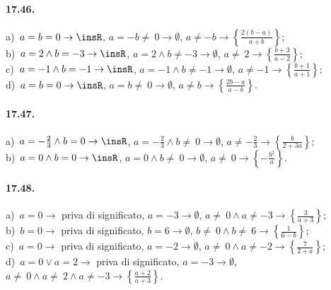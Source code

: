 \paragraph{17.46.}
a)~$a=b=0 \rightarrow \insR$, $a=-b\neq~0 \rightarrow \emptyset$, $a\neq -b \rightarrow \left\{\frac{2(b-a)}{a+b}\right\}$;
\protect\\ b)~$a=2\wedge b=-3 \rightarrow \insR$, $a=2\wedge b\neq -3 \rightarrow \emptyset$, $a\neq~2 \rightarrow \left\{\frac{b+3}{a-2}\right\}$;
\protect\\ c)~$a=-1\wedge b=-1 \rightarrow \insR$, $a=-1\wedge b\neq -1 \rightarrow \emptyset$, $a\neq -1 \rightarrow \left\{\frac{b+1}{a+1}\right\}$;
\protect\\ d)~$a=b=0 \rightarrow \insR$, $a=b\neq~0 \rightarrow \emptyset$, $a\neq b \rightarrow \left\{\frac{2b-a}{a-b}\right\}$.

\paragraph{17.47.}
a)~$a=-{\frac{2}{3}}\wedge b=0 \rightarrow \insR$, $a=-{\frac{2}{3}}\wedge b\neq~0 \rightarrow \emptyset$, $a\neq -{\frac{2}{3}} \rightarrow \left\{\frac{b}{2+3a}\right\}$;
\protect\\ b)~$a=0\wedge b=0 \rightarrow \insR$, $a=0\wedge b\neq~0 \rightarrow \emptyset$, $a\neq~0 \rightarrow \left\{-{\frac{b^{2}}{a}}\right\}$.

\paragraph{17.48.}
a)~$a=0 \rightarrow$ priva di significato, $a=-3 \rightarrow \emptyset$, $a\neq~0\wedge a\neq -3 \rightarrow \left\{\frac{3}{a+3}\right\}$;
\protect\\ b)~$b=0 \rightarrow$ priva di significato, $b=6 \rightarrow \emptyset$, $b\neq~0\wedge b\neq~6 \rightarrow \left\{\frac{1}{6-b}\right\}$;
\protect\\ c)~$a=0 \rightarrow$ priva di significato, $a=-2 \rightarrow \emptyset$, $a\neq~0\wedge a\neq -2 \rightarrow \left\{\frac{7}{2+a}\right\}$;
\protect\\ d)~$a=0\vee a=2 \rightarrow$ priva di significato, $a=-3 \rightarrow \emptyset$, $a\neq~0\wedge a\neq~2\wedge a\neq -3 \rightarrow \left\{\frac{a+2}{a+3}\right\}$.

